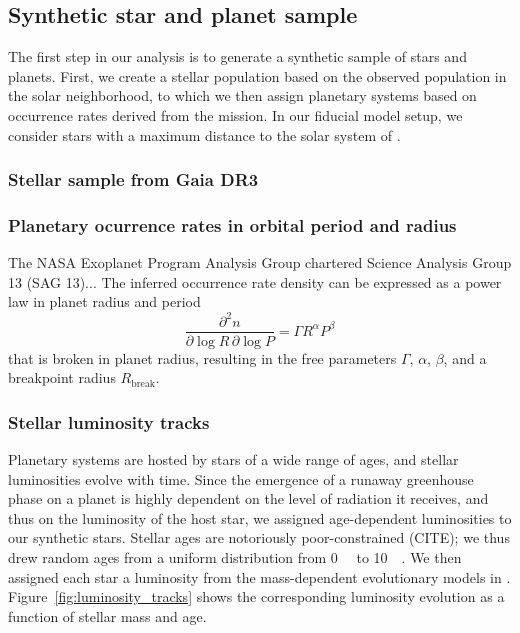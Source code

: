 \documentclass[modern]{aastex631}
\begin{document}
\subsection{Synthetic star and planet sample}
\begin{note}
    The first step in our analysis is to generate a synthetic sample of stars and planets.
    First, we create a stellar population based on the observed population in the solar neighborhood, to which we then assign planetary systems based on occurrence rates derived from the \kepler mission.
    In our fiducial model setup, we consider stars with a maximum distance to the solar system of \dmax.
\end{note}

\subsubsection{Stellar sample from Gaia DR3}

\subsubsection{Planetary ocurrence rates in orbital period and radius}
\begin{note}
    The NASA Exoplanet Program Analysis Group chartered Science Analysis Group 13 (SAG 13)...
    The inferred occurrence rate density can be expressed as a power law in planet radius and period
    \begin{equation}
        \frac{\partial^2n}{\partial \log R \, \partial \log P} = \Gamma R^{\alpha} P^{\beta}
    \end{equation}
that is broken in planet radius, resulting in the free parameters $\Gamma$, $\alpha$, $\beta$, and a breakpoint radius $R_\mathrm{break}$.
\end{note}

\subsubsection{Stellar luminosity tracks}
\begin{note}
    Planetary systems are hosted by stars of a wide range of ages, and stellar luminosities evolve with time.
    Since the emergence of a runaway greenhouse phase on a planet is highly dependent on the level of radiation it receives, and thus on the luminosity of the host star, we assigned age-dependent luminosities to our synthetic stars.
    Stellar ages are notoriously poor-constrained (CITE); we thus drew random ages from a uniform distribution from \SI{0}{\giga\year} to \SI{10}{\giga\year}.
    We then assigned each star a luminosity from the mass-dependent evolutionary models in \citet{Baraffe1998}.
    Figure~\ref{fig:luminosity_tracks} shows the corresponding luminosity evolution as a function of stellar mass and age.

\end{note}
\end{document}
